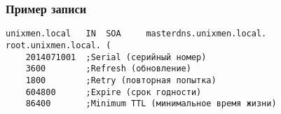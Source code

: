 \begin{frame}[fragile]
    \frametitle{Пример записи}
    
\begin{lstlisting}
unixmen.local   IN  SOA     masterdns.unixmen.local. root.unixmen.local. (
    2014071001  ;Serial (серийный номер)
    3600        ;Refresh (обновление)
    1800        ;Retry (повторная попытка)
    604800      ;Expire (срок годности)
    86400       ;Minimum TTL (минимальное время жизни)
\end{lstlisting}

\end{frame}